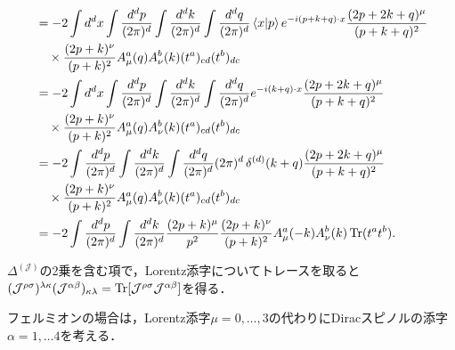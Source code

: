 \begin{align*}
  &= -2\int d^dx \int\frac{d^dp}{(2\pi)^d} \int\frac{d^dk}{(2\pi)^d} \int\frac{d^dq}{(2\pi)^d}
  \braket{x|p} e^{-i(p+k+q)\cdot x} \frac{(2p+2k+q)^\mu}{(p+k+q)^2} \\
  &\quad\times \frac{(2p+k)^\nu}{(p+k)^2} A_\mu^a(q) A_\nu^b(k) (t^a)_{cd} (t^b)_{dc} \\
  &= -2\int d^dx \int\frac{d^dp}{(2\pi)^d} \int\frac{d^dk}{(2\pi)^d} \int\frac{d^dq}{(2\pi)^d}
  e^{-i(k+q)\cdot x} \frac{(2p+2k+q)^\mu}{(p+k+q)^2} \\
  &\quad\times \frac{(2p+k)^\nu}{(p+k)^2} A_\mu^a(q) A_\nu^b(k) (t^a)_{cd} (t^b)_{dc} \\
  &= -2\int\frac{d^dp}{(2\pi)^d} \int\frac{d^dk}{(2\pi)^d} \int\frac{d^dq}{(2\pi)^d}
  (2\pi)^d \mathop{\delta^{(d)}}(k+q) \frac{(2p+2k+q)^\mu}{(p+k+q)^2} \\
  &\quad\times \frac{(2p+k)^\nu}{(p+k)^2} A_\mu^a(q) A_\nu^b(k) (t^a)_{cd} (t^b)_{dc} \\
  &= -2\int\frac{d^dp}{(2\pi)^d} \int\frac{d^dk}{(2\pi)^d} \frac{(2p+k)^\mu}{p^2}
   \frac{(2p+k)^\nu}{(p+k)^2} A_\mu^a(-k) A_\nu^b(k) \operatorname{Tr}(t^a t^b) .
\end{align*}

$\Delta^{(\mathcal{J})}$の2乗を含む項で，Lorentz添字についてトレースを取ると$(\mathcal{J}^{\rho\sigma})^{\lambda\kappa} (\mathcal{J}^{\alpha\beta})_{\kappa\lambda} = \operatorname{Tr}[\mathcal{J}^{\rho\sigma}\mathcal{J}^{\alpha\beta}]$を得る．

フェルミオンの場合は，Lorentz添字$\mu=0,\ldots,3$の代わりにDiracスピノルの添字$\alpha=1,\ldots4$を考える．
